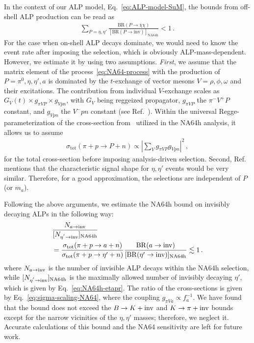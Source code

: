 \documentclass[aps,prd,preprintnumbers,superscriptaddress,nofootinbib,floatfix,twocolumn,notitlepage,reprint]{revtex4-2}
\newcommand{\inv}{{\rm inv}}
\newcommand{\BR}{\mathrm{BR}}
\begin{document}
In the context of our ALP model, Eq.~\eqref{eq:ALP-model-SuM}, the bounds from off-shell ALP production can be read as
%
\begin{align}
    \label{eq:bound-meson-NA64}
    \sum_{P = \eta,\eta'} 
    \frac{\BR(P\to \bar{\chi}\chi)}{[\BR(P\to \text{inv})]_{\text{NA64h}}} < 1\,.
\end{align}
%
For the case when on-shell ALP decays dominate, we would need to know the event rate after imposing the selection, which is obviously ALP-mass-dependent. 
However, we estimate it by using two assumptions. 
\emph{First}, we assume that the matrix element of the process~\eqref{eq:NA64-process} with the production of $P = \pi^{0},\eta,\eta',a$ is dominated by the $t$-exchange of vector mesons $V = \rho, \phi, \omega$ and their excitations. 
The contribution from individual $V$-exchange scales as $G_{V}(t)\times g_{\pi VP}\times g_{Vpn}$, with $G_{V}$ being reggeized propagator, $g_{\pi VP}$ the $\pi^{-}V^{+}P$ constant, and $g_{Vpn}$ the $V^{-}pn$ constant (see Ref.~\cite{Balkin:2026whv}). 
Within the universal Regge-parameterization of the cross-section from~\cite{Gninenko:2023rbf} utilized in the NA64h analysis, it allows us to assume 
%
\begin{align}
    \sigma_{\text{tot}}(\pi+p\to P+n)
    \propto 
    \left|\sum_{V}g_{\pi VP}g_{Vpn}\right|^{2} \, ,
    \label{eq:sigma-scaling-NA64}
\end{align}
%
for the total cross-section before imposing analysis-driven selection. 
Second, Ref.~\cite{NA64:2024mah} mentions that the characteristic signal shape for $\eta,\eta'$ events would be very similar. 
Therefore, for a good approximation, the selections are independent of $P$ (or $m_a$).

Following the above arguments, we estimate the NA64h bound on invisibly decaying ALPs in the following way:
%
\begin{align}
    &\frac{N_{a\to \inv}}{[N_{\eta^{'}\to \inv}]_{\text{NA64h}}} 
    \nonumber\\ 
    &= \frac{\sigma_{\text{tot}}(\pi+p\to a+n)}{\sigma_{\text{tot}}(\pi+p\to \eta'+n)}\frac{\BR(a\to\inv)}{[\BR(\eta'\to \text{inv})]_{\rm NA64h}} 
    \lesssim 1  \, .
\end{align}
%
where $N_{a\to \inv}$ is the number of invisible ALP decays within the NA64h selection, while $[N_{\eta^{'}\to \inv}]_{\text{NA64h}}$ is the maximally allowed number of invisibly decaying $\eta'$, which is given by Eq.~\eqref{eq:NA64h-etapr}. The ratio of the cross-sections is given by Eq.~\eqref{eq:sigma-scaling-NA64}, where the coupling $g_{\pi Va}\propto f_{a}^{-1}$.
We have found that the bound does not exceed the $B\to K+\inv$ and $K\to \pi+\inv$ bounds except for the narrow vicinities of the $\eta,\eta'$ masses; therefore, we neglect it. 
Accurate calculations of this bound and the NA64 sensitivity are left for future work.

\clearpage
\end{document}
